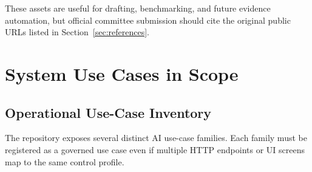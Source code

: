 \documentclass[11pt,a4paper]{article}
\begin{document}
These assets are useful for drafting, benchmarking, and future evidence automation, but official committee submission should cite the original public URLs listed in Section~\ref{sec:references}.

\section{System Use Cases in Scope}

\subsection{Operational Use-Case Inventory}

The repository exposes several distinct AI use-case families. Each family must be registered as a governed use case even if multiple HTTP endpoints or UI screens map to the same control profile.
\end{document}
